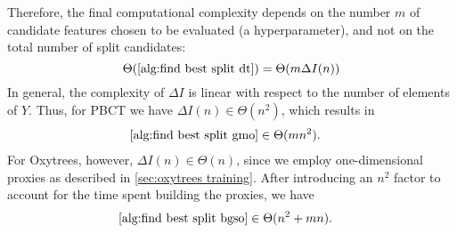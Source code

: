 \documentclass[sn-mathphys-num]{sn-jnl}%
\theoremstyle{thmstyleone}%
\theoremstyle{thmstyletwo}%
\theoremstyle{thmstylethree}%
\begin{document}
\begin{appendices}
% 
Therefore, the final computational complexity depends on the number $m$ of candidate features chosen to be evaluated (a hyperparameter), and not on the total number of split candidates:
\begin{equation}
    \Theta(\text{\ref{alg:find best split dt}}) = \Theta(m \Delta I (n))
\end{equation}
%
In general, the complexity of $\Delta I$ is linear with respect to the number of elements of $Y$. Thus, for PBCT we have $\Delta I(n) \in \Theta (n^2)$, which results in
%
\begin{align}
    \label{eq:complexity find split gmo}
    \text{\ref{alg:find best split gmo}}
        &\in \Theta(m n^2)
    \text{.}
\end{align}
For Oxytrees, however, $\Delta I(n) \in \Theta (n)$, since we employ one-dimensional proxies as described in \autoref{sec:oxytrees training}. After introducing an $n^2$ factor to account for the time spent building the proxies, we have
\begin{align}
    \label{eq:complexity find split bgso}
    \text{\ref{alg:find best split bgso}}
        &\in \Theta(n^2 + m n)
    \text{.}
\end{align}


\end{appendices}
\end{document}
